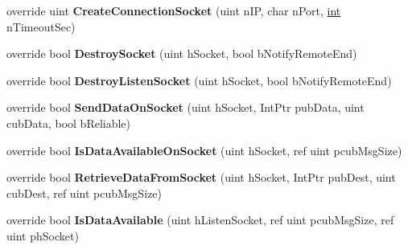 \begin{DoxyCompactItemize}
\item 
\hypertarget{classValve_1_1Steamworks_1_1CSteamNetworking_adab573d0528ac303902c1cb053ed4c31}{}override uint {\bfseries Create\+Connection\+Socket} (uint n\+I\+P, char n\+Port, \hyperlink{SDL__thread_8h_a6a64f9be4433e4de6e2f2f548cf3c08e}{int} n\+Timeout\+Sec)\label{classValve_1_1Steamworks_1_1CSteamNetworking_adab573d0528ac303902c1cb053ed4c31}

\item 
\hypertarget{classValve_1_1Steamworks_1_1CSteamNetworking_a5e010664164cc1cffad7dd61476092de}{}override bool {\bfseries Destroy\+Socket} (uint h\+Socket, bool b\+Notify\+Remote\+End)\label{classValve_1_1Steamworks_1_1CSteamNetworking_a5e010664164cc1cffad7dd61476092de}

\item 
\hypertarget{classValve_1_1Steamworks_1_1CSteamNetworking_aa498dfc539301fc83cf70a7bb1bc3a42}{}override bool {\bfseries Destroy\+Listen\+Socket} (uint h\+Socket, bool b\+Notify\+Remote\+End)\label{classValve_1_1Steamworks_1_1CSteamNetworking_aa498dfc539301fc83cf70a7bb1bc3a42}

\item 
\hypertarget{classValve_1_1Steamworks_1_1CSteamNetworking_a3d5809784f21a706db8e9e2eeb4e5d81}{}override bool {\bfseries Send\+Data\+On\+Socket} (uint h\+Socket, Int\+Ptr pub\+Data, uint cub\+Data, bool b\+Reliable)\label{classValve_1_1Steamworks_1_1CSteamNetworking_a3d5809784f21a706db8e9e2eeb4e5d81}

\item 
\hypertarget{classValve_1_1Steamworks_1_1CSteamNetworking_a0369d43036ae46c27165eff84fa0ec80}{}override bool {\bfseries Is\+Data\+Available\+On\+Socket} (uint h\+Socket, ref uint pcub\+Msg\+Size)\label{classValve_1_1Steamworks_1_1CSteamNetworking_a0369d43036ae46c27165eff84fa0ec80}

\item 
\hypertarget{classValve_1_1Steamworks_1_1CSteamNetworking_a0927fdb86487028128c3cd74f0cab953}{}override bool {\bfseries Retrieve\+Data\+From\+Socket} (uint h\+Socket, Int\+Ptr pub\+Dest, uint cub\+Dest, ref uint pcub\+Msg\+Size)\label{classValve_1_1Steamworks_1_1CSteamNetworking_a0927fdb86487028128c3cd74f0cab953}

\item 
\hypertarget{classValve_1_1Steamworks_1_1CSteamNetworking_a1c724d50f6d78eed3e73647ada3d56b7}{}override bool {\bfseries Is\+Data\+Available} (uint h\+Listen\+Socket, ref uint pcub\+Msg\+Size, ref uint ph\+Socket)\label{classValve_1_1Steamworks_1_1CSteamNetworking_a1c724d50f6d78eed3e73647ada3d56b7}


\end{DoxyCompactItemize}
